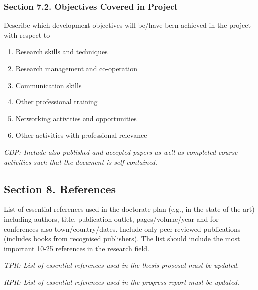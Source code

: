 \documentclass[12pt]{article}
\begin{document}
\subsubsection*{Section 7.2. Objectives Covered in Project}
Describe which development objectives will be/have been achieved in the project with respect to
\begin{enumerate}
\item Research skills and techniques
\item Research management and co-operation
\item Communication skills
\item Other professional training
\item Networking activities and opportunities
\item Other activities with professional relevance
\end{enumerate}

\begin{shaded}
\noindent
\emph{
CDP: Include also published and accepted papers as well as completed course activities such that the document is self-contained.}
\end{shaded}



\subsection*{Section 8. References}

List of essential references used in the doctorate plan (e.g., in the state of the art) including authors, title, publication outlet, pages/volume/year and for conferences also town/country/dates. Include only peer-reviewed publications (includes books from recognised publishers). The list should include the most important 10-25 references in the research field.

\begin{shaded}
\noindent
\emph{TPR: List of essential references used in the thesis proposal must be updated.}

\noindent
\emph{RPR: List of essential references used in the progress report must be updated.}
\end{shaded}

\pagebreak

\noindent{}\\[5mm]
\end{document}
